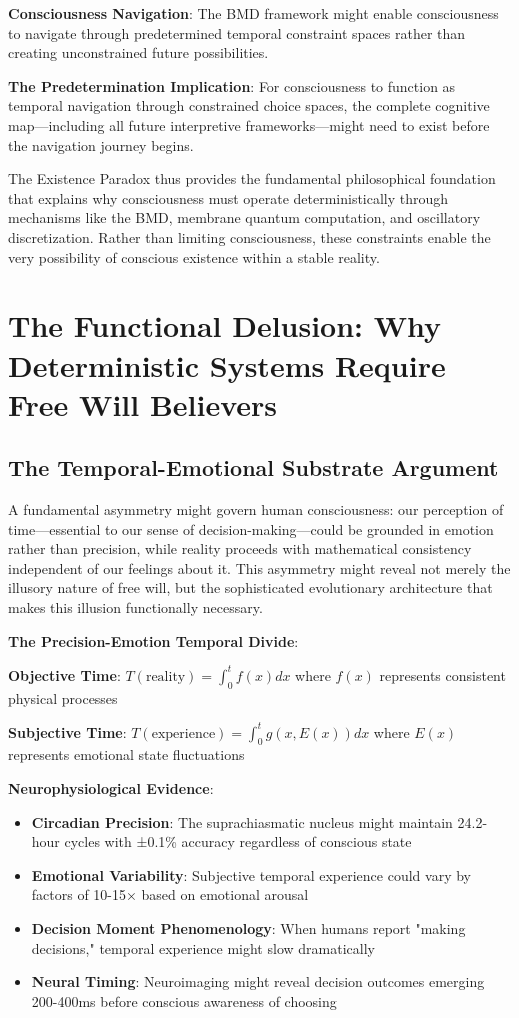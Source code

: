 \documentclass[12pt]{article}
\begin{document}
\textbf{Consciousness Navigation}: The BMD framework might enable consciousness to navigate through predetermined temporal constraint spaces rather than creating unconstrained future possibilities.

\textbf{The Predetermination Implication}: For consciousness to function as temporal navigation through constrained choice spaces, the complete cognitive map—including all future interpretive frameworks—might need to exist before the navigation journey begins.

The Existence Paradox thus provides the fundamental philosophical foundation that explains why consciousness must operate deterministically through mechanisms like the BMD, membrane quantum computation, and oscillatory discretization. Rather than limiting consciousness, these constraints enable the very possibility of conscious existence within a stable reality.

\section{The Functional Delusion: Why Deterministic Systems Require Free Will Believers}

\subsection{The Temporal-Emotional Substrate Argument}

A fundamental asymmetry might govern human consciousness: our perception of time—essential to our sense of decision-making—could be grounded in emotion rather than precision, while reality proceeds with mathematical consistency independent of our feelings about it. This asymmetry might reveal not merely the illusory nature of free will, but the sophisticated evolutionary architecture that makes this illusion functionally necessary.

\textbf{The Precision-Emotion Temporal Divide}:

\textbf{Objective Time}: $T(\text{reality}) = \int_0^t f(x)dx$ where $f(x)$ represents consistent physical processes

\textbf{Subjective Time}: $T(\text{experience}) = \int_0^t g(x,E(x))dx$ where $E(x)$ represents emotional state fluctuations

\textbf{Neurophysiological Evidence}:
\begin{itemize}
\item \textbf{Circadian Precision}: The suprachiasmatic nucleus might maintain 24.2-hour cycles with ±0.1\% accuracy regardless of conscious state
\item \textbf{Emotional Variability}: Subjective temporal experience could vary by factors of 10-15× based on emotional arousal
\item \textbf{Decision Moment Phenomenology}: When humans report "making decisions," temporal experience might slow dramatically
\item \textbf{Neural Timing}: Neuroimaging might reveal decision outcomes emerging 200-400ms before conscious awareness of choosing
\end{itemize}
\end{document}
